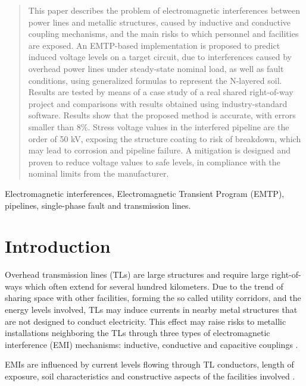 \documentclass{IEEEtran4PSCC}
\begin{document}
\begin{abstract}
This paper describes the problem of electromagnetic interferences between power lines and metallic structures, caused by inductive and conductive coupling mechanisms, and the main risks to which personnel and facilities are exposed. An EMTP-based implementation is proposed to predict induced voltage levels on a target circuit, due to interferences caused by overhead power lines under steady-state nominal load, as well as fault conditions, using generalized formulas to represent the N-layered soil. Results are tested by means of a case study of a real shared right-of-way project and comparisons with results obtained using industry-standard software. Results show that the proposed method is accurate, with errors smaller than 8\%. Stress voltage values in the interfered pipeline are the order of 50 kV, exposing the structure  coating to risk of breakdown, which may lead to corrosion and pipeline failure. A mitigation is designed and proven to reduce voltage values to safe levels, in compliance with the nominal limits from the manufacturer.
\end{abstract}

\begin{IEEEkeywords}
Electromagnetic interferences, Electromagnetic Transient Program (EMTP), pipelines, single-phase fault and transmission lines.
\end{IEEEkeywords}




\section{Introduction}


Overhead transmission lines (TLs) are large structures and
require large right-of-ways which often extend for several hundred kilometers. Due to the trend of sharing space with other facilities, forming the so called utility corridors, and the energy levels involved,  TLs may induce currents in nearby metal structures that are not designed to conduct electricity. This effect may raise risks to metallic installations neighboring the TLs through three types of electromagnetic interference (EMI) mechanisms: inductive, conductive and capacitive couplings \cite{CIGREWG36}.

EMIs are influenced by current levels flowing through TL conductors, length of exposure, soil characteristics and constructive aspects of the facilities involved \cite{CIGREWG36}. 
\end{document}
